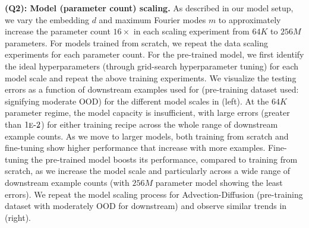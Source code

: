 \medskip
\noindent \textbf{(Q2): Model (parameter count) scaling.}
As described in our
model setup, we vary the embedding $d$ and maximum Fourier modes $m$ to
approximately increase the parameter count $16\times$ in each scaling experiment from $64K$ to $256M$ parameters. 
For models trained from scratch, we repeat the data scaling experiments for each parameter count. For the pre-trained model, we first identify the ideal hyperparameters (through grid-search hyperparameter tuning) for each model scale and repeat the above training experiments.
We visualize the testing errors as a function of downstream examples used for \sysAfiveten{} (pre-training dataset used: \sysAonefive{} signifying moderate OOD) for the different model scales in  (left). At the $64K$ parameter regime, the model capacity is insufficient, with large errors (greater than $1\text{\sc{e}-}{2}$) for either training recipe across the whole range of downstream example counts. As we move to larger models, both training from scratch and fine-tuning show higher performance that increase with more examples.
Fine-tuning the pre-trained model boosts its performance, compared to training from scratch, as we increase the model scale and particularly across a wide range of downstream example counts (with $256M$ parameter model showing the least errors).
We repeat the model scaling process for Advection-Diffusion \sysB{} (pre-training dataset \sysBzeropttwoone{} with moderately OOD \sysBonetwo{} for downstream) and observe similar trends in  (right).


